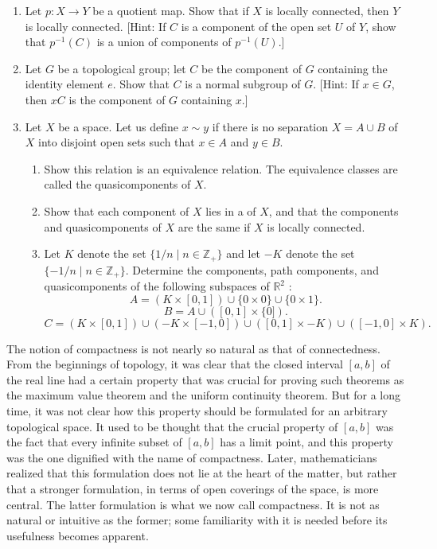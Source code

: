 \begin{enumerate}[itemsep=0.4em, parsep=0pt, topsep=0pt, partopsep=0pt, leftmargin=*, label=\arabic*., ref=\arabic*]
\item Let \(p : X \rightarrow Y\) be a quotient map. Show that if \(X\) is locally connected, then \(Y\) is locally connected. [Hint: If \(C\) is a component of the open set \(U\) of \(Y\), show that \(p^{-1}( C)\) is a union of components of \(p^{-1}( U)\).]
\item Let \(G\) be a topological group; let \(C\) be the component of \(G\) containing the identity element \(e\). Show that \(C\) is a normal subgroup of \(G\). [Hint: If \(x \in G\), then \({xC}\) is the component of \(G\) containing \(x\).]
\item Let \(X\) be a space. Let us define \(x \sim y\) if there is no separation \(X = A \cup B\) of \(X\) into disjoint open sets such that \(x \in A\) and \(y \in B\).
 \begin{enumerate}[itemsep=0.2em, parsep=0pt, topsep=0pt, partopsep=0pt, leftmargin=*, label=(\alph*), align=left]
 \item Show this relation is an equivalence relation. The equivalence classes are called the quasicomponents of \(X\).
 \item Show that each component of \(X\) lies in a  of \(X\), and that the components and quasicomponents of \(X\) are the same if \(X\) is locally connected.
 \item Let \(K\) denote the set \(\{ {1/n \mid n \in {\mathbb{Z}}_{ + }}\}\) and let \(- K\) denote the set \(\{ - 1/n \mid n \in {\mathbb{Z}}_{ + }\}\). Determine the components, path components, and quasicomponents of the following subspaces of \(\mathbb{R}^{2}\) : \[ A = ( {K \times [ {0,1}] }) \cup \{ 0 \times 0\} \cup \{ 0 \times 1\}. \] \[ B = A \cup ( {[ {0,1}] \times \{ 0\rbrack }) \text{.} \] \[ C = ( {K \times [ {0,1}] }) \cup ( {-K \times [ {-1,0}] }) \cup ( {[ {0,1}] \times - K}) \cup ( {[ {-1,0}] \times K}). \]
 \end{enumerate}
\end{enumerate}

The notion of compactness is not nearly so natural as that of connectedness. From the beginnings of topology, it was clear that the closed interval \([ {a,b}]\) of the real line had a certain property that was crucial for proving such theorems as the maximum value theorem and the uniform continuity theorem. But for a long time, it was not clear how this property should be formulated for an arbitrary topological space. It used to be thought that the crucial property of \([ {a,b}]\) was the fact that every infinite subset of \([ {a,b}]\) has a limit point, and this property was the one dignified with the name of compactness. Later, mathematicians realized that this formulation does not lie at the heart of the matter, but rather that a stronger formulation, in terms of open coverings of the space, is more central. The latter formulation is what we now call compactness. It is not as natural or intuitive as the former; some familiarity with it is needed before its usefulness becomes apparent.

